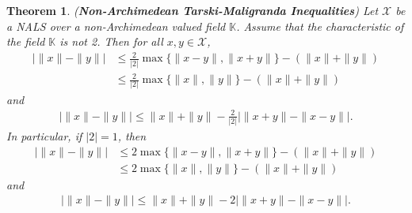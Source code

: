 \documentclass[10pt,a4paper]{amsart}
\newtheorem{theorem}{Theorem}
\begin{document}
\begin{theorem}\label{NTM}
(\textbf{Non-Archimedean Tarski-Maligranda Inequalities})
Let $\mathcal{X}$ be a NALS over a non-Archimedean valued field $\mathbb{K}$. Assume that the characteristic of the field $\mathbb{K}$ is not 2. Then for all $x, y \in \mathcal{X}$, 
\begin{align*}
	\bigg|\|x\|-\|y\|\bigg|&\leq \frac{2}{|2|}\max\{\|x-y\|, \|x+y\|\}-(\|x\|+\|y\|)\\
	&\leq \frac{2}{|2|}\max\{\|x\|, \|y\|\}-(\|x\|+\|y\|)
\end{align*}
and 
\begin{align*}
	\bigg|\|x\|-\|y\|\bigg|\leq \|x\|+\|y\|-\frac{2}{|2|}\bigg|\|x+y\|-\|x-y\|\bigg|.
\end{align*}	
In particular, if $|2|=1$, then 
\begin{align*}
\bigg|\|x\|-\|y\|\bigg|&\leq 2\max\{\|x-y\|, \|x+y\|\}-(\|x\|+\|y\|)\\
&\leq 2\max\{\|x\|, \|y\|\}-(\|x\|+\|y\|)
\end{align*}
and 
\begin{align*}
\bigg|\|x\|-\|y\|\bigg|\leq \|x\|+\|y\|-2\bigg|\|x+y\|-\|x-y\|\bigg|.
\end{align*}	
\end{theorem}
\end{document}
